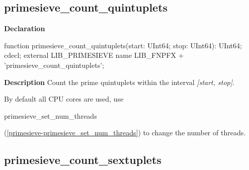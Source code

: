 \documentclass{report}
\newif\ifpdf
\begin{document}
\subsection*{primesieve{\_}count{\_}quintuplets}
\fi
\label{primesieve-primesieve_count_quintuplets}
\begin{list}{}{
\setlength{\itemindent}{0cm}
\setlength{\listparindent}{0cm}
\setlength{\leftmargin}{\evensidemargin}
\addtolength{\leftmargin}{\tmplength}
\settowidth{\labelsep}{X}
\addtolength{\leftmargin}{\labelsep}
\setlength{\labelwidth}{\tmplength}
}
\item[\textbf{Declaration}\hfill]
\ifpdf
\begin{flushleft}
\fi
\begin{ttfamily}
function primesieve{\_}count{\_}quintuplets(start: UInt64; stop: UInt64): UInt64; cdecl; external LIB{\_}PRIMESIEVE name LIB{\_}FNPFX + 'primesieve{\_}count{\_}quintuplets';\end{ttfamily}

\ifpdf
\end{flushleft}
\fi

\par
\item[\textbf{Description}]
Count the prime quintuplets within the interval \textit{[start, stop]}.

By default all CPU cores are used, use \begin{ttfamily}primesieve{\_}set{\_}num{\_}threads\end{ttfamily}(\ref{primesieve-primesieve_set_num_threads}) to change the number of threads.

\end{list}
\ifpdf
\subsection*{\large{\textbf{primesieve{\_}count{\_}sextuplets}}\normalsize\hspace{1ex}\hrulefill}
\else
\end{document}
